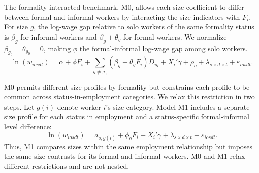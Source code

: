 The formality-interacted benchmark, M0, allows each size coefficient to differ
between formal and informal workers by interacting the size indicators with
\(F_i\). For size \(g\), the log-wage gap relative to solo workers of the
same formality status is \(\beta_g\) for informal workers and
\(\beta_g+\theta_g\) for formal workers. We normalize
\(\beta_{g_0}=\theta_{g_0}=0\), making \(\phi\) the formal-informal
log-wage gap among solo workers.
\begin{equation}\label{eq:main}
  \ln(w_{iosdt}) = \alpha + \phi F_i
  + \sum_{g\neq g_0}(\beta_g+\theta_g F_i)D_{ig}
  + X_i'\gamma + \rho_o + \lambda_{s\times d\times t}
  + \varepsilon_{iosdt}.
\end{equation}



M0 permits different size profiles by formality but constrains each profile
to be common across status-in-employment categories. We relax this restriction
in two steps. Let \(g(i)\) denote worker \(i\)'s size category.
Model M1 includes a separate size profile for each status in employment
and a status-specific formal-informal level difference:
\begin{equation}\label{eq:status-size}
  \ln(w_{iosdt}) = a_{o,g(i)}+\phi_o F_i+X_i'\gamma
  +\lambda_{s\times d\times t}+\varepsilon_{iosdt}.
\end{equation}
Thus, M1 compares sizes within the same employment relationship but imposes
the same size contrasts for its formal and informal workers. M0 and M1
relax different restrictions and are not nested.

